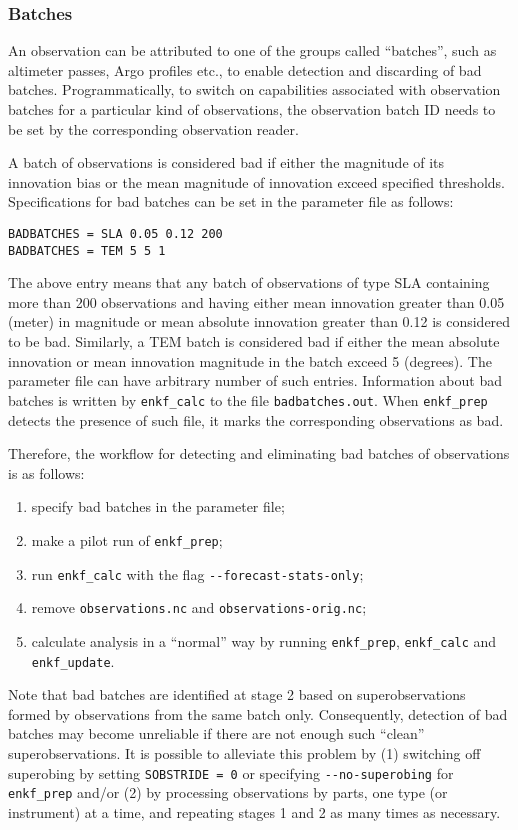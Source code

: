 \documentclass[11pt]{report}
\begin{document}
\subsubsection{Batches}

An observation can be attributed to one of the groups called ``batches'', such as altimeter passes, Argo profiles etc., to enable detection and discarding of bad batches.
Programmatically, to switch on capabilities associated with observation batches for a particular kind of observations, the observation batch ID needs to be set by the corresponding observation reader.

A batch of observations is considered bad if either the magnitude of its innovation bias or the mean magnitude of innovation exceed specified thresholds.
Specifications for bad batches can be set in the parameter file as follows:
\begin{Verbatim}[frame=single,fontsize=\footnotesize]
BADBATCHES = SLA 0.05 0.12 200
BADBATCHES = TEM 5 5 1
\end{Verbatim}
The above entry means that any batch of observations of type SLA containing more than 200 observations and having either mean innovation greater than 0.05 (meter) in magnitude or mean absolute innovation greater than 0.12 is considered to be bad.
Similarly, a TEM batch is considered bad if either the mean absolute innovation or mean innovation magnitude in the batch exceed 5 (degrees).
The parameter file can have arbitrary number of such entries.
Information about bad batches is written by \verb|enkf_calc| to the file \verb|badbatches.out|.
When \verb|enkf_prep| detects the presence of such file, it marks the corresponding observations as bad.

Therefore, the workflow for detecting and eliminating bad batches of observations is as follows:
\begin{enumerate}
\item specify bad batches in the parameter file;
\item make a pilot run of \verb|enkf_prep|;
\item run \verb|enkf_calc| with the flag \verb|--forecast-stats-only|;
\item remove \verb|observations.nc| and \verb|observations-orig.nc|;
\item calculate analysis in a ``normal'' way by running \verb|enkf_prep|, \verb|enkf_calc| and \verb|enkf_update|.
\end{enumerate}

Note that bad batches are identified at stage 2 based on superobservations formed by observations from the same batch only.
Consequently, detection of bad batches may become unreliable if there are not enough such ``clean'' superobservations.
It is possible to alleviate this problem by (1) switching off superobing by setting \verb|SOBSTRIDE = 0| or specifying \verb|--no-superobing| for \verb|enkf_prep| and/or (2) by processing observations by parts, one type (or instrument) at a time, and repeating stages 1 and 2 as many times as necessary.
\end{document}
